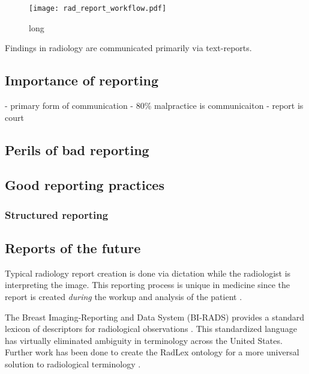 


\begin{figure}[h]
	\centering
	\texttt{[image: rad\_report\_workflow.pdf]}
	\caption[short]{long}
	\label{fig:}
\end{figure}
Findings in radiology are communicated primarily via text-reports.

\subsection{Importance of reporting}
\cite{Sistrom:2005cx} - primary form of communication
\cite{Levinson:1994ko} - 80\% malpractice is communicaiton
\cite{Oppenheim:2012tq} - report is court

\subsection{Perils of bad reporting}

\subsection{Good reporting practices}

\subsubsection{Structured reporting}


\subsection{Reports of the future}

Typical radiology report creation is done via dictation while the radiologist is interpreting the image. This reporting process is unique in medicine since the report is created \emph{during} the workup and analysis of the patient \cite{Noumeir:2006cb}.


The Breast Imaging-Reporting and Data System (BI-RADS) provides a standard lexicon of descriptors for radiological observations \cite{Liberman:ws}. This standardized language has virtually eliminated ambiguity in terminology across the United States. Further work has been done to create the RadLex ontology for a more universal solution to radiological terminology \cite{Langlotz:2006jn}.

